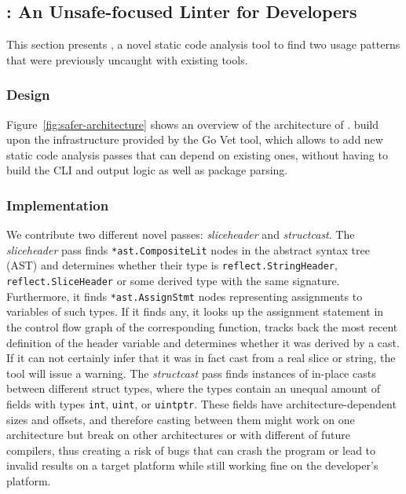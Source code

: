 \subsection{\toolSA{}: An Unsafe-focused Linter for Developers}

This section presents \toolSA{}, a novel static code analysis tool to find two usage patterns that were previously uncaught with existing tools.

\subsubsection*{Design}

Figure~\ref{fig:safer-architecture} shows an overview of the architecture of \toolSA{}.
\toolSA{} build upon the infrastructure provided by the Go Vet tool, which allows to add new static code analysis passes that can depend on existing ones, without having to build the CLI and output logic as well as package parsing.






\subsubsection*{Implementation}

We contribute two different novel passes: \textit{sliceheader} and \textit{structcast}.
The \textit{sliceheader} pass finds \texttt{*ast.CompositeLit} nodes in the abstract syntax tree (AST) and determines whether their type is \texttt{reflect.StringHeader}, \texttt{reflect.SliceHeader} or some derived type with the same signature.
Furthermore, it finds \texttt{*ast.AssignStmt} nodes representing assignments to variables of such types.
If it finds any, it looks up the assignment statement in the control flow graph of the corresponding function, tracks back the most recent definition of the header variable and determines whether it was derived by a cast.
If it can not certainly infer that it was in fact cast from a real slice or string, the tool will issue a warning.
The \textit{structcast} pass finds instances of in-place casts between different struct types, where the types contain an unequal amount of fields with types \texttt{int}, \texttt{uint}, or \texttt{uintptr}.
These fields have architecture-dependent sizes and offsets, and therefore casting between them might work on one architecture but break on other architectures or with different of future compilers, thus creating a risk of bugs that can crash the program or lead to invalid results on a target platform while still working fine on the developer's platform.


